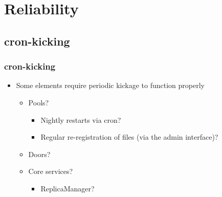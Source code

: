 \documentclass{beamer}
\begin{document}
\section{Reliability}
\subsection{cron-kicking}
\begin{frame}
\frametitle{cron-kicking}
\begin{itemize}
    \item Some elements require periodic kickage to function properly
    \begin{itemize}
        \item Pools?
        \begin{itemize}
            \item Nightly restarts via cron?
            \item Regular re-registration of files (via the admin interface)?
        \end{itemize}
        \item Doors?
        \item Core services?
        \begin{itemize}
            \item ReplicaManager?
        \end{itemize}
    \end{itemize}
\end{itemize}
\end{frame}
\end{document}
